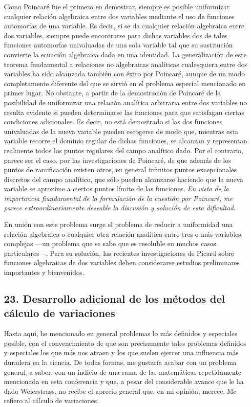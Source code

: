 \documentclass[a4paper, 12pt]{article}
\begin{document}
{Como Poincaré fue el primero en demostrar, siempre es posible uniformizar cualquier relación algebraica entre dos variables mediante el uso de funciones automorfas de una variable. Es decir, si se da cualquier relación algebraica entre dos variables, siempre puede encontrarse para dichas variables dos de tales funciones automorfas univaluadas de una
sola variable tal que su sustitución convierte la ecuación algebraica dada en una identidad. La generalización de este teorema fundamental a relaciones no algebraicas analíticas cualesquiera entre dos variables ha sido alcanzada también con éxito por Poincaré, aunque de un modo completamente diferente del que se sirvió en el problema especial mencionado en primer lugar. No obstante, a partir de la demostración de Poincaré de la posibilidad de uniformizar una relación analítica arbitraria entre dos variables no resulta evidente si pueden determinarse las funciones para que satisfagan ciertas condiciones adicionales. Es decir, no está demostrado si las dos funciones univaluadas de la nueva variable pueden escogerse de modo que, mientras esta variable recorre el dominio regular de dichas funciones, se alcanzan y representan realmente todos los puntos regulares del campo analítico dado. Por el contrario, parece ser el caso, por las investigaciones de Poincaré, de que además de los puntos de ramificación existen otros, en general infinitos puntos excepcionales discretos del campo analítico, que sólo pueden alcanzarse haciendo que la nueva variable se aproxime a ciertos puntos límite de las funciones. \textit{En vista de la importancia fiundamental de la formulación de la cuestión por Poincaré, me parece extraordinariamente deseable la discusión y solución de esta dificultad.}

En unión con este problema surge el problema de reducir a uniformidad una relación algebraica o cualquier otra relación analítica entre tres o más variables complejas ---un problema que se sabe que es resoluble en muchos casos particulares---. Para su solución, las recientes investigaciones de Picard sobre funciones algebraicas de dos variables deben considerarse estudios preliminares importantes y bienvenidos.


\subsection*{23. Desarrollo adicional de los métodos del cálculo de variaciones}

Hasta aquí, he mencionado en general problemas lo más definidos y especiales posible, con el convencimiento de que son precisamente tales problemas definidos y especiales los que más nos atraen y los que suelen ejercer una influencia más duradera en la ciencia. De todas formas, me gustaría acabar con un problema general, a saber, con un indicio de una rama de las matemáticas repetidamente mencionada en esta conferencia y que, a pesar del considerable avance que le ha dado Weierstrass, no recibe el aprecio general que, en mi opinión, merece. Me refiero al cálculo de variaciones.

}
\end{document}
